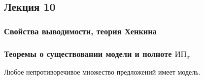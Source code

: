 \subsection{Лекция 10}

\subsubsection{Свойства выводимости, теория Хенкина}


%

\subsubsection{Теоремы о существовании модели и полноте $\text{ИП}_\sigma$}

\begin{theorem}
Любое непротиворечивое множество предложений имеет модель.
\end{theorem}

